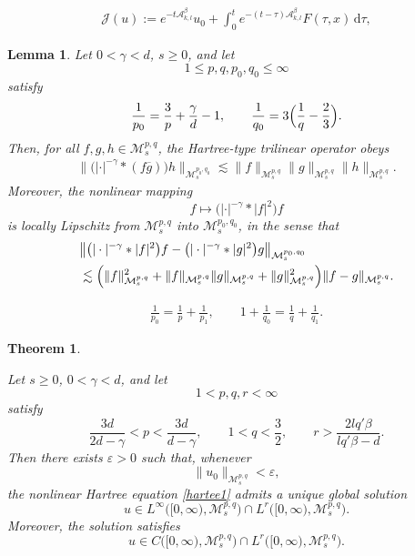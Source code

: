 \documentclass[10pt,a4paper]{amsart}
\newtheorem{theorem}{Theorem}
\newtheorem{lemma}{Lemma}
\def \Ad{\mathcal{A}_{k,l}}
\def\M{\mathcal{M}}
\begin{document}
\begin{align}
\label{Duhamel}
\mathcal{J}(u)
:=e^{-t\Ad^{\beta}}u_{0}
+\int_{0}^{t}e^{-(t-\tau)\Ad^{\beta}}F(\tau,x)\,\mathrm{d}\tau,
\end{align}

\begin{lemma}
\label{Trlnerlma}
Let $0<\gamma<d$, $s\geq 0$, and let
\[
1\leq p,q,p_{0},q_{0}\leq \infty
\]
satisfy
\[
\frac{1}{p_{0}}
=
\frac{3}{p}
+\frac{\gamma}{d}
-1,
\qquad
\frac{1}{q_{0}}
=
3\Bigl(\frac{1}{q}-\frac{2}{3}\Bigr).
\]
Then, for all $f,g,h\in \M^{p,q}_{s}$, the Hartree-type trilinear operator obeys
\begin{align}
\label{Trlnr1}
\bigl\|
\bigl(|\cdot|^{-\gamma}*(f\overline{g})\bigr)h
\bigr\|_{\M^{p_{0},q_{0}}_{s}}
\lesssim
\|f\|_{\M^{p,q}_{s}}
\|g\|_{\M^{p,q}_{s}}
\|h\|_{\M^{p,q}_{s}}.
\end{align}
Moreover, the nonlinear mapping
\[
f \mapsto \bigl(|\cdot|^{-\gamma}*|f|^{2}\bigr)f
\]
is locally Lipschitz from $\M^{p,q}_{s}$ into $\M^{p_{0},q_{0}}_{s}$, in the sense that
\begin{align}
\label{Trlnr2}
&
\bigl\|
\bigl(|\cdot|^{-\gamma}*|f|^{2}\bigr)f
-
\bigl(|\cdot|^{-\gamma}*|g|^{2}\bigr)g
\bigr\|_{\M^{p_{0},q_{0}}_{s}}
\nonumber\\
&\lesssim
\Bigl(
\|f\|_{\M^{p,q}_{s}}^{2}
+
\|f\|_{\M^{p,q}_{s}}
\|g\|_{\M^{p,q}_{s}}
+
\|g\|_{\M^{p,q}_{s}}^{2}
\Bigr)
\|f-g\|_{\M^{p,q}_{s}}.
\end{align}
\end{lemma}

\begin{align}
\label{T101}
\frac{1}{p_{0}}
=
\frac{1}{p}
+
\frac{1}{p_{1}},
\qquad
1+\frac{1}{q_{0}}
=
\frac{1}{q}
+
\frac{1}{q_{1}}.
\end{align}

\begin{theorem}
\label{welposedness2}

Let $s\geq 0$, $0<\gamma<d$, and let
\[
1<p,q,r<\infty
\]
satisfy
\[
\frac{3d}{2d-\gamma}
<
p
<
\frac{3d}{d-\gamma},
\qquad
1<q<\frac{3}{2},
\qquad
r>
\frac{2lq'\beta}{lq'\beta-d}.
\]
Then there exists $\varepsilon>0$ such that, whenever
\[
\|u_{0}\|_{\M^{p,q}_{s}}<\varepsilon,
\]
the nonlinear Hartree equation \eqref{hartee1} admits a unique global solution
\[
u
\in
L^{\infty}\bigl([0,\infty),\M^{p,q}_{s}\bigr)
\cap
L^{r}\bigl([0,\infty),\M^{p,q}_{s}\bigr).
\]
Moreover, the solution satisfies
\[
u
\in
C\bigl([0,\infty),\M^{p,q}_{s}\bigr)
\cap
L^{r}\bigl([0,\infty),\M^{p,q}_{s}\bigr).
\]
\end{theorem}
\end{document}
